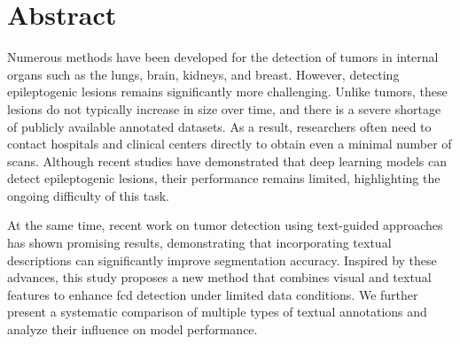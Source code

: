 \documentclass[FCD_GNN.tex]{subfiles}
\begin{document}
\chapter*{Abstract}

Numerous methods have been developed for the detection of tumors in internal organs such as the lungs, brain, kidneys, and breast. 
However, detecting epileptogenic lesions remains significantly more challenging. 
Unlike tumors, these lesions do not typically increase in size over time, and there is a severe shortage of publicly available annotated datasets. 
As a result, researchers often need to contact hospitals and clinical centers directly to obtain even a minimal number of scans. 
Although recent studies have demonstrated that deep learning models can detect epileptogenic lesions, their performance remains limited, highlighting the 
ongoing difficulty of this task.

At the same time, recent work on tumor detection using text-guided approaches has shown promising results, demonstrating that incorporating textual 
descriptions can significantly improve segmentation accuracy. 
Inspired by these advances, this study proposes a new method that combines visual and textual features to enhance \ac{fcd} detection 
under limited data conditions. 
We further present a systematic comparison of multiple types of textual annotations and analyze their influence on model performance.

\end{document}
